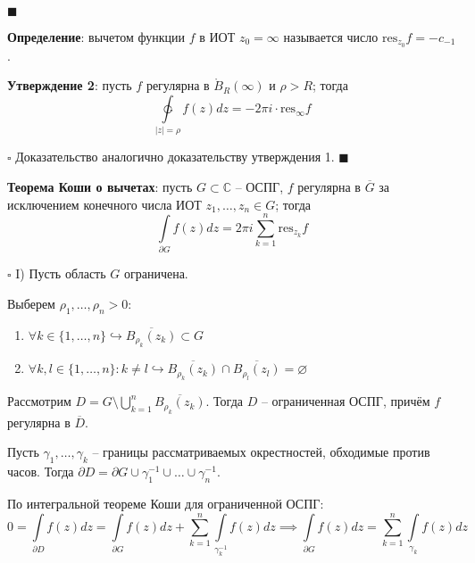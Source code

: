 \documentclass[12pt, a4paper, reqno]{article}
\begin{document}
    $\blacksquare$

    \textbf{Определение}: вычетом функции $f$ в ИОТ $z_0 = \infty$ называется число $\text{res}_{z_0} f = -c_{-1}$.

    \textbf{Утверждение 2}: пусть $f$ регулярна в $\mathring B_R(\infty)$ и $\rho > R$; тогда
    \begin{equation*}
        \ointctrclockwise\limits_{|z| = \rho} f(z)dz = -2\pi i \cdot \text{res}_{\infty} f
    \end{equation*}

    $\square$ Доказательство аналогично доказательству утверждения 1. $\blacksquare$

    \textbf{Теорема Коши о вычетах}: пусть $G \subset \mathbb{C}$ -- ОСПГ, $f$ регулярна в
    $\overline{G}$ за исключением конечного числа ИОТ $z_1, \ldots, z_n \in G$; тогда
    \begin{equation*}
        \int\limits_{\partial G} f(z)dz = 2\pi i \sum\limits_{k = 1}^{n} \text{res}_{z_k} f
    \end{equation*}

    $\square$ I) Пусть область $G$ ограничена.

    Выберем $\rho_1, \ldots, \rho_n > 0$:
    \begin{enumerate}
        \item $\forall k \in \{1, \ldots, n\} \hookrightarrow \overline{B_{\rho_k}(z_k)} \subset G$
        \item $\forall k, l \in \{1, \ldots, n\}: k \neq l \hookrightarrow
              \overline{B_{\rho_k}(z_k)} \cap \overline{B_{\rho_l}(z_l)} = \varnothing$
    \end{enumerate}

    Рассмотрим $D = G \setminus \bigcup\limits_{k = 1}^{n} \overline{B_{\rho_k}(z_k)}$. Тогда
    $D$ -- ограниченная ОСПГ, причём $f$ регулярна в $\overline{D}$.

    Пусть $\gamma_1, \ldots, \gamma_k$ -- границы рассматриваемых окрестностей, обходимые против часов.
    Тогда $\partial D = \partial G \cup \gamma_1^{-1} \cup \ldots \cup \gamma_n^{-1}$.

    По интегральной теореме Коши для ограниченной ОСПГ:
    \begin{equation*}
        0 = \int\limits_{\partial D} f(z)dz = \int\limits_{\partial G} f(z)dz +
        \sum\limits_{k = 1}^{n} \int\limits_{\gamma_k^{-1}} f(z)dz \implies
        \int\limits_{\partial G} f(z)dz = \sum\limits_{k = 1}^{n} \int\limits_{\gamma_k} f(z)dz
    \end{equation*}
\end{document}

